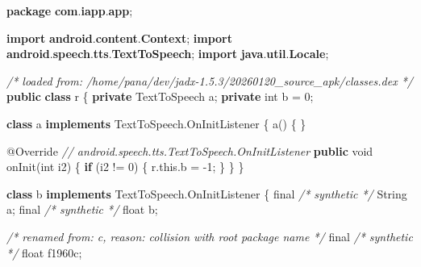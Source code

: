 \documentclass[
]{article}
\newenvironment{Shaded}{}{}
\newcommand{\AttributeTok}[1]{\textcolor[rgb]{0.49,0.56,0.16}{#1}}
\newcommand{\BuiltInTok}[1]{\textcolor[rgb]{0.00,0.50,0.00}{#1}}
\newcommand{\CommentTok}[1]{\textcolor[rgb]{0.38,0.63,0.69}{\textit{#1}}}
\newcommand{\ControlFlowTok}[1]{\textcolor[rgb]{0.00,0.44,0.13}{\textbf{#1}}}
\newcommand{\DataTypeTok}[1]{\textcolor[rgb]{0.56,0.13,0.00}{#1}}
\newcommand{\DecValTok}[1]{\textcolor[rgb]{0.25,0.63,0.44}{#1}}
\newcommand{\FunctionTok}[1]{\textcolor[rgb]{0.02,0.16,0.49}{#1}}
\newcommand{\ImportTok}[1]{\textcolor[rgb]{0.00,0.50,0.00}{\textbf{#1}}}
\newcommand{\KeywordTok}[1]{\textcolor[rgb]{0.00,0.44,0.13}{\textbf{#1}}}
\newcommand{\NormalTok}[1]{#1}
\newcommand{\OperatorTok}[1]{\textcolor[rgb]{0.40,0.40,0.40}{#1}}
\begin{document}
\begin{Shaded}
\begin{Highlighting}[]
\KeywordTok{package}\ImportTok{ com}\OperatorTok{.}\ImportTok{iapp}\OperatorTok{.}\ImportTok{app}\OperatorTok{;}

\KeywordTok{import} \ImportTok{android}\OperatorTok{.}\ImportTok{content}\OperatorTok{.}\ImportTok{Context}\OperatorTok{;}
\KeywordTok{import} \ImportTok{android}\OperatorTok{.}\ImportTok{speech}\OperatorTok{.}\ImportTok{tts}\OperatorTok{.}\ImportTok{TextToSpeech}\OperatorTok{;}
\KeywordTok{import} \ImportTok{java}\OperatorTok{.}\ImportTok{util}\OperatorTok{.}\ImportTok{Locale}\OperatorTok{;}

\CommentTok{/* loaded from: /home/pana/dev/jadx{-}1.5.3/20260120\_source\_apk/classes.dex */}
\KeywordTok{public} \KeywordTok{class}\NormalTok{ r }\OperatorTok{\{}
    \KeywordTok{private}\NormalTok{ TextToSpeech a}\OperatorTok{;}
    \KeywordTok{private} \DataTypeTok{int}\NormalTok{ b }\OperatorTok{=} \DecValTok{0}\OperatorTok{;}

    \KeywordTok{class}\NormalTok{ a }\KeywordTok{implements}\NormalTok{ TextToSpeech}\OperatorTok{.}\FunctionTok{OnInitListener} \OperatorTok{\{}
        \FunctionTok{a}\OperatorTok{()} \OperatorTok{\{}
        \OperatorTok{\}}

        \AttributeTok{@Override} \CommentTok{// android.speech.tts.TextToSpeech.OnInitListener}
        \KeywordTok{public} \DataTypeTok{void} \FunctionTok{onInit}\OperatorTok{(}\DataTypeTok{int}\NormalTok{ i2}\OperatorTok{)} \OperatorTok{\{}
            \ControlFlowTok{if} \OperatorTok{(}\NormalTok{i2 }\OperatorTok{!=} \DecValTok{0}\OperatorTok{)} \OperatorTok{\{}
\NormalTok{                r}\OperatorTok{.}\FunctionTok{this}\OperatorTok{.}\FunctionTok{b} \OperatorTok{=} \OperatorTok{{-}}\DecValTok{1}\OperatorTok{;}
            \OperatorTok{\}}
        \OperatorTok{\}}
    \OperatorTok{\}}

    \KeywordTok{class}\NormalTok{ b }\KeywordTok{implements}\NormalTok{ TextToSpeech}\OperatorTok{.}\FunctionTok{OnInitListener} \OperatorTok{\{}
        \DataTypeTok{final} \CommentTok{/* synthetic */} \BuiltInTok{String}\NormalTok{ a}\OperatorTok{;}
        \DataTypeTok{final} \CommentTok{/* synthetic */} \DataTypeTok{float}\NormalTok{ b}\OperatorTok{;}

        \CommentTok{/* renamed from: c, reason: collision with root package name */}
        \DataTypeTok{final} \CommentTok{/* synthetic */} \DataTypeTok{float}\NormalTok{ f1960c}\OperatorTok{;}


\end{Highlighting}
\end{Shaded}
\end{document}
